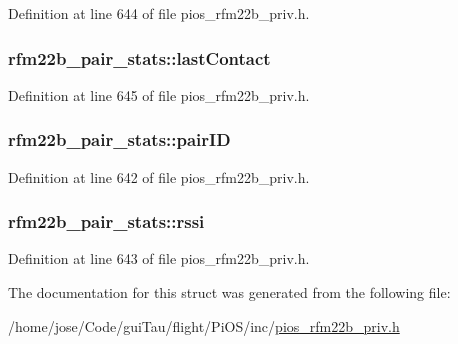 Definition at line 644 of file pios\-\_\-rfm22b\-\_\-priv.\-h.

\hypertarget{structrfm22b__pair__stats_a54401550bc26e4923636667ba5df8d34}{
\subsubsection[{last\-Contact}]{ rfm22b\-\_\-pair\-\_\-stats\-::last\-Contact}}\label{structrfm22b__pair__stats_a54401550bc26e4923636667ba5df8d34}


Definition at line 645 of file pios\-\_\-rfm22b\-\_\-priv.\-h.

\hypertarget{structrfm22b__pair__stats_aecbce2c6a0ece945bc66e3fc007a25e2}{
\subsubsection[{pair\-I\-D}]{ rfm22b\-\_\-pair\-\_\-stats\-::pair\-I\-D}}\label{structrfm22b__pair__stats_aecbce2c6a0ece945bc66e3fc007a25e2}


Definition at line 642 of file pios\-\_\-rfm22b\-\_\-priv.\-h.

\hypertarget{structrfm22b__pair__stats_a44c32f693c666d5f5e1d0bef314f47d7}{
\subsubsection[{rssi}]{ rfm22b\-\_\-pair\-\_\-stats\-::rssi}}\label{structrfm22b__pair__stats_a44c32f693c666d5f5e1d0bef314f47d7}


Definition at line 643 of file pios\-\_\-rfm22b\-\_\-priv.\-h.



The documentation for this struct was generated from the following file\-:\begin{DoxyCompactItemize}
\item 
/home/jose/\-Code/gui\-Tau/flight/\-Pi\-O\-S/inc/\hyperlink{pios__rfm22b__priv_8h}{pios\-\_\-rfm22b\-\_\-priv.\-h}\end{DoxyCompactItemize}
